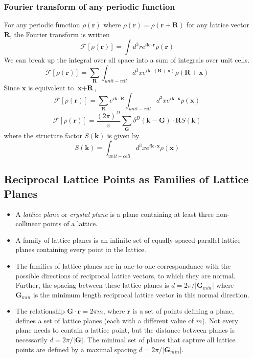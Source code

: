 \documentclass[10pt]{article}
\begin{document}
\subsubsection{Fourier transform of any periodic function}
For any periodic function $\rho(\textbf{r})$ where $\rho(\textbf{r}) = \rho(\textbf{r} + \textbf{R})$ for any lattice vector $\textbf{R}$, the
Fourier transform is written
$$\mathcal{F}[\rho(\textbf{r})] = \int d^3 r e^{i\textbf{k}\cdot\textbf{r}}\rho(\textbf{r})$$
We can break up the integral over all space into a sum of integrals over unit cells.
$$\mathcal{F}[\rho(\textbf{r})] = \sum_{\textbf{R}}\int_{unit-cell} d^3 x e^{i\textbf{k}\cdot(\textbf{R}+\textbf{x})}\rho(\textbf{R} + \textbf{x})$$
Since $\textbf{x}$ is equivalent to $\textbf{x} + \textbf{R}$,
$$\mathcal{F}[\rho(\textbf{r})] = \sum_{\textbf{R}}e^{i\textbf{k}\cdot\textbf{R}}\int_{unit-cell} d^3 x e^{i\textbf{k}\cdot\textbf{x}}\rho(\textbf{x})$$
$$\mathcal{F}[\rho(\textbf{r})] = \frac{(2\pi)^{D}}{v} \sum_{\textbf{G}} \delta^{D}(\textbf{k} - \textbf{G}) \cdot \textbf{R}S(\textbf{k})$$
where the structure factor $S(\textbf{k})$ is given by
$$S(\textbf{k}) = \int_{unit-cell} d^3 x e^{i\textbf{k}\cdot\textbf{x}}\rho(\textbf{x})$$

\subsection{Reciprocal Lattice Points as Families of Lattice Planes}
\begin{itemize}
\item A \emph{lattice plane} or \emph{crystal plane} is a plane containing at least three non-collinear points of a lattice.
\item A family of lattice planes is an infinite set of equally-spaced parallel lattice planes containing every point in the lattice.
\item The families of lattice planes are in one-to-one correspondance with the possible directions of reciprocal lattice vectors, to which
they are normal. Further, the spacing between these lattice planes is $d = 2\pi/|\textbf{G}_{min}|$ where $\textbf{G}_{min}$ is the minimum
length reciprocal lattice vector in this normal direction.
\item The relationship $\textbf{G}\cdot \textbf{r} = 2\pi m$, where $\textbf{r}$ is a set of points defining a plane, defines a set of
lattice planes (each with a different value of $m$). Not every plane needs to contain a lattice point, but the distance between planes is necessarily
$d = 2\pi/|\textbf{G}|$. The minimal set of planes that capture all lattice points are defined by a maximal spacing $d = 2\pi/|\textbf{G}_{min}|$.
\end{itemize}
\end{document}
